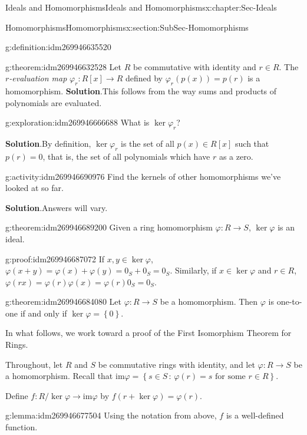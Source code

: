\documentclass[oneside,10pt,]{book}
\numberwithin{equation}{section}
\def\p{\varphi}
\def\im{\text{im}}
\newcommand{\set}[1]{\left\{ {#1} \right\}}
\newcommand{\setof}[2]{{\left\{#1\,\colon\,#2\right\}}}
\begin{document}
\begin{chapterptx}{Ideals and Homomorphisms}{}{Ideals and Homomorphisms}{}{}{x:chapter:Sec-Ideals}
\begin{sectionptx}{Homomorphisms}{}{Homomorphisms}{}{}{x:section:SubSec-Homomorphisms}
\begin{definition}{}{g:definition:idm269946635520}
\end{definition}
\begin{theorem}{}{}{g:theorem:idm269946632528}%
Let \(R\) be commutative with identity and \(r\in R\). The \emph{\(r\)-evaluation map} \(\p_r : R[x] \to R\) defined by \(\p_r(p(x)) = p(r)\) is a homomorphism.%
\textbf{Solution}.\quad{}This follows from the way sums and products of polynomials are evaluated.%
\end{theorem}
\begin{exploration}{}{g:exploration:idm269946666688}%
What is \(\ker \p_r\)?%
\par\smallskip%
\noindent\textbf{Solution}.\hypertarget{g:solution:idm269946672000}{}\quad{}By definition, \(\ker \p_r\) is the set of all \(p(x)\in R[x]\) such that \(p(r) =0\), that is, the set of all polynomials which have \(r\) as a zero.\end{exploration}
\begin{activity}{}{g:activity:idm269946690976}%
Find the kernels of other homomorphisms we've looked at so far.%
\par\smallskip%
\noindent\textbf{Solution}.\hypertarget{g:solution:idm269946689792}{}\quad{}Answers will vary.\end{activity}
\begin{theorem}{}{}{g:theorem:idm269946689200}%
Given a ring homomorphism \(\p : R\to S\), \(\ker\p\) is an ideal.%
\end{theorem}
\begin{proofptx}{}{g:proof:idm269946687072}
If \(x,y\in \ker\p\), \(\p(x+y) = \p(x) + \p(y) = 0_S + 0_S = 0_S\). Similarly, if \(x\in \ker \p\) and \(r\in R\), \(\p(rx) = \p(r) \p(x) = \p(r) 0_S = 0_S\).%
\end{proofptx}
\begin{theorem}{}{}{g:theorem:idm269946684080}%
Let \(\p : R\to S\) be a homomorphism. Then \(\p\) is one-to-one if and only if \(\ker\p = \set{0}\).%
\end{theorem}
In what follows, we work toward a proof of the First Isomorphism Theorem for Rings.%
\par
Throughout, let \(R\) and \(S\) be commutative rings with identity, and let \(\p : R\to S\) be a homomorphism. Recall that \(\im \p = \setof{s\in S}{\p(r) = s\text{ for some } r\in R}\).%
\par
Define \(f: R/\ker \p \to \im \p\) by \(f(r+\ker \p) = \p(r)\).%
\begin{lemma}{}{}{g:lemma:idm269946677504}%
Using the notation from above, \(f\) is a well-defined function.%

\end{lemma}
\end{sectionptx}
\end{chapterptx}
\end{document}

